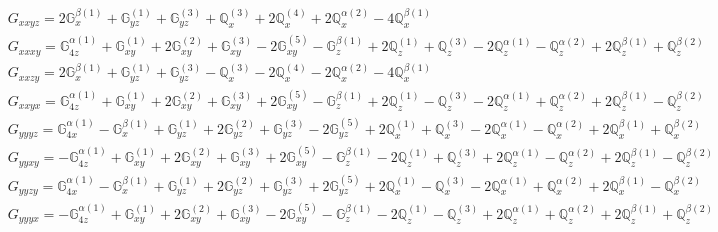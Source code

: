 \documentclass[fleqn,8pt,landscape]{jsarticle}
\begin{document}
\begin{align*}
& G_{xxyz} = 2 \mathbb{G}_{x}^{\beta(1)} + \mathbb{G}_{yz}^{(1)} + \mathbb{G}_{yz}^{(3)} + \mathbb{Q}_{x}^{(3)} + 2 \mathbb{Q}_{x}^{(4)} + 2 \mathbb{Q}_{x}^{\alpha(2)} - 4 \mathbb{Q}_{x}^{\beta(1)} \\
& G_{xxxy} = \mathbb{G}_{4z}^{\alpha(1)} + \mathbb{G}_{xy}^{(1)} + 2 \mathbb{G}_{xy}^{(2)} + \mathbb{G}_{xy}^{(3)} - 2 \mathbb{G}_{xy}^{(5)} - \mathbb{G}_{z}^{\beta(1)} + 2 \mathbb{Q}_{z}^{(1)} + \mathbb{Q}_{z}^{(3)} - 2 \mathbb{Q}_{z}^{\alpha(1)} - \mathbb{Q}_{z}^{\alpha(2)} + 2 \mathbb{Q}_{z}^{\beta(1)} + \mathbb{Q}_{z}^{\beta(2)} \\
& G_{xxzy} = 2 \mathbb{G}_{x}^{\beta(1)} + \mathbb{G}_{yz}^{(1)} + \mathbb{G}_{yz}^{(3)} - \mathbb{Q}_{x}^{(3)} - 2 \mathbb{Q}_{x}^{(4)} - 2 \mathbb{Q}_{x}^{\alpha(2)} - 4 \mathbb{Q}_{x}^{\beta(1)} \\
& G_{xxyx} = \mathbb{G}_{4z}^{\alpha(1)} + \mathbb{G}_{xy}^{(1)} + 2 \mathbb{G}_{xy}^{(2)} + \mathbb{G}_{xy}^{(3)} + 2 \mathbb{G}_{xy}^{(5)} - \mathbb{G}_{z}^{\beta(1)} + 2 \mathbb{Q}_{z}^{(1)} - \mathbb{Q}_{z}^{(3)} - 2 \mathbb{Q}_{z}^{\alpha(1)} + \mathbb{Q}_{z}^{\alpha(2)} + 2 \mathbb{Q}_{z}^{\beta(1)} - \mathbb{Q}_{z}^{\beta(2)} \\
& G_{yyyz} = \mathbb{G}_{4x}^{\alpha(1)} - \mathbb{G}_{x}^{\beta(1)} + \mathbb{G}_{yz}^{(1)} + 2 \mathbb{G}_{yz}^{(2)} + \mathbb{G}_{yz}^{(3)} - 2 \mathbb{G}_{yz}^{(5)} + 2 \mathbb{Q}_{x}^{(1)} + \mathbb{Q}_{x}^{(3)} - 2 \mathbb{Q}_{x}^{\alpha(1)} - \mathbb{Q}_{x}^{\alpha(2)} + 2 \mathbb{Q}_{x}^{\beta(1)} + \mathbb{Q}_{x}^{\beta(2)} \\
& G_{yyxy} = - \mathbb{G}_{4z}^{\alpha(1)} + \mathbb{G}_{xy}^{(1)} + 2 \mathbb{G}_{xy}^{(2)} + \mathbb{G}_{xy}^{(3)} + 2 \mathbb{G}_{xy}^{(5)} - \mathbb{G}_{z}^{\beta(1)} - 2 \mathbb{Q}_{z}^{(1)} + \mathbb{Q}_{z}^{(3)} + 2 \mathbb{Q}_{z}^{\alpha(1)} - \mathbb{Q}_{z}^{\alpha(2)} + 2 \mathbb{Q}_{z}^{\beta(1)} - \mathbb{Q}_{z}^{\beta(2)} \\
& G_{yyzy} = \mathbb{G}_{4x}^{\alpha(1)} - \mathbb{G}_{x}^{\beta(1)} + \mathbb{G}_{yz}^{(1)} + 2 \mathbb{G}_{yz}^{(2)} + \mathbb{G}_{yz}^{(3)} + 2 \mathbb{G}_{yz}^{(5)} + 2 \mathbb{Q}_{x}^{(1)} - \mathbb{Q}_{x}^{(3)} - 2 \mathbb{Q}_{x}^{\alpha(1)} + \mathbb{Q}_{x}^{\alpha(2)} + 2 \mathbb{Q}_{x}^{\beta(1)} - \mathbb{Q}_{x}^{\beta(2)} \\
& G_{yyyx} = - \mathbb{G}_{4z}^{\alpha(1)} + \mathbb{G}_{xy}^{(1)} + 2 \mathbb{G}_{xy}^{(2)} + \mathbb{G}_{xy}^{(3)} - 2 \mathbb{G}_{xy}^{(5)} - \mathbb{G}_{z}^{\beta(1)} - 2 \mathbb{Q}_{z}^{(1)} - \mathbb{Q}_{z}^{(3)} + 2 \mathbb{Q}_{z}^{\alpha(1)} + \mathbb{Q}_{z}^{\alpha(2)} + 2 \mathbb{Q}_{z}^{\beta(1)} + \mathbb{Q}_{z}^{\beta(2)} \\

\end{align*}
\end{document}
